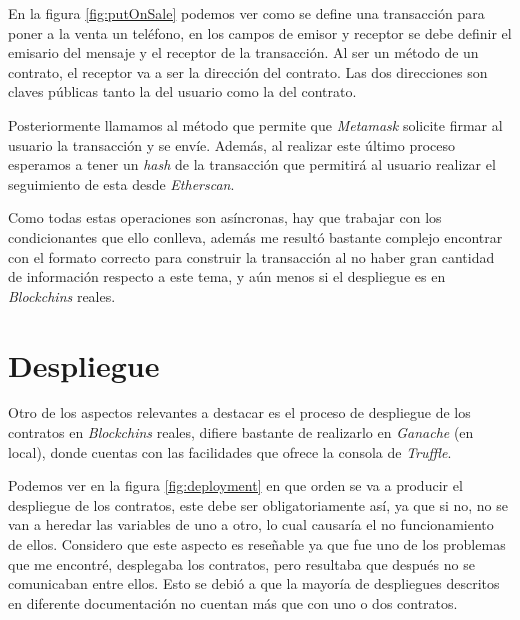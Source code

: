 
En la figura \ref{fig:putOnSale} podemos ver como se define una transacción para poner a la venta un teléfono, en los campos de emisor y receptor se debe definir el emisario del mensaje y el receptor de la transacción. Al ser un método de un contrato, el receptor va a ser la dirección del contrato. Las dos direcciones son claves públicas tanto la del usuario como la del contrato.

Posteriormente llamamos al método que permite que \textit{Metamask} solicite firmar al usuario la transacción y se envíe. Además, al realizar este último proceso esperamos a tener un \textit{hash} de la transacción que permitirá al usuario realizar el seguimiento de esta desde \textit{Etherscan}.

Como todas estas operaciones son asíncronas, hay que trabajar con los condicionantes que ello conlleva, además me resultó bastante complejo encontrar con el formato correcto para construir la transacción al no haber gran cantidad de información respecto a este tema, y aún menos si el despliegue es en \textit{Blockchins} reales.

\section{Despliegue}

Otro de los aspectos relevantes a destacar es el proceso de despliegue de los contratos en \textit{Blockchins} reales, difiere bastante de realizarlo en \textit{Ganache} (en local), donde cuentas con las facilidades que ofrece la consola de \textit{Truffle}.


Podemos ver en la figura \ref{fig:deployment} en que orden se va a producir el despliegue de los contratos, este debe ser obligatoriamente así, ya que si no, no se van a heredar las variables de uno a otro, lo cual causaría el no funcionamiento de ellos. Considero que este aspecto es reseñable ya que fue uno de los problemas que me encontré, desplegaba los contratos, pero resultaba que después no se comunicaban entre ellos. Esto se debió a que la mayoría de despliegues descritos en diferente documentación  no cuentan más que con uno o dos contratos.




